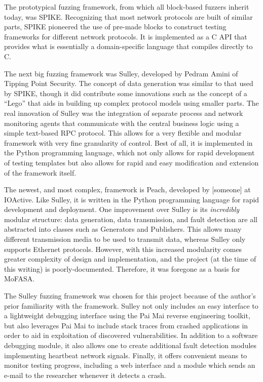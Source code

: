\documentclass{report}
\begin{document}
The prototypical fuzzing framework, from which all block-based fuzzers inherit today, was SPIKE. Recognizing that most network protocols
are built of similar parts, SPIKE pioneered the use of pre-made blocks to construct testing frameworks for different network protocols.
It is implemented as a C API that provides what is essentially a domain-specific language that compiles directly to C.

The next big fuzzing framework was Sulley, developed by Pedram Amini of Tipping Point Security. The concept of data generation was similar
to that used by SPIKE, though it did contribute some innovations such as the concept of a ``Lego'' that aids in building up complex
protocol models using smaller parts. The real innovation of Sulley was the integration of separate process and network monitoring agents
that communicate with the central business logic using a simple text-based RPC protocol. This allows for a very flexible and modular
framework with very fine granularity of control. Best of all, it is implemented in the Python programming language, which not only
allows for rapid development of testing templates but also allows for rapid and easy modification and extension of the framework
itself.

The newest, and most complex, framework is Peach, developed by [someone] at IOActive. Like Sulley, it is written in the Python programming
language for rapid development and deployment. One improvement over Sulley is its \emph{incredibly} modular structure: data generation,
data transmission, and fault detection are all abstracted into classes such as Generators and Publishers. This allows many different
transmission media to be used to transmit data, whereas Sulley only supports Ethernet protocols. However, with this increased modularity
comes greater complexity of design and implementation, and the project (at the time of this writing) is poorly-documented. Therefore,
it was foregone as a basis for MoFASA.

The Sulley fuzzing framework was chosen for this project because of the author's prior familiarity with the framework. Sulley
not only includes an easy interface to a lightweight debugging interface using the Pai Mai reverse engineering toolkit, but
also leverages Pai Mai to include stack traces from crashed applications in order to aid in exploitation of discovered
vulnerabilities. In addition to a software debugging module, it also allows one to create additional fault detection modules
implementing heartbeat network signals. Finally, it offers convenient means to monitor testing progress, including a web interface
and a module which sends an e-mail to the researcher whenever it detects a crash.
\end{document}
